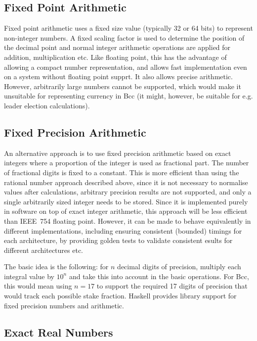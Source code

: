 \documentclass[11pt,a4paper,dvipsnames,twosided]{article}
\theoremstyle{definition}
\theoremstyle{definition}
\begin{document}
\subsection{Fixed Point Arithmetic}

Fixed point arithmetic uses a fixed size value (typically 32 or 64 bits) to
represent non-integer numbers.  A fixed scaling factor is used to determine the
position of the decimal point and normal integer arithmetic operations are
applied for addition, multiplication etc.  Like floating point, this has the
advantage of allowing a compact number representation, and allows fast implementation even on
a system without floating point supprt.  It also allows precise arithmetic.  However,
arbitrarily large numbers cannot be supported, which would make it unsuitable for
representing currency in Bcc (it might, however, be suitable for e.g. leader election calculations).


\subsection{Fixed Precision Arithmetic}
\label{sec:fixed-point-arithm}

An alternative approach is to use fixed precision arithmetic based on exact
integers where a proportion of the integer is used as fractional part.  The
number of fractional digits is fixed to a constant.  This is more efficient than
using the rational number approach described above, since it is not necessary to
normalise values after calculations, arbitrary precision results are not
supported, and only a single arbitrarily sized integer needs to be stored.
Since it is implemented purely in software on top of exact integer arithmetic,
this approach will be less efficient than IEEE~754 floating point.  However, it
can be made to behave equivalently in different implementations, including
ensuring consistent (bounded) timings for each architecture, by providing golden
tests to validate consistent esults for different architectures etc.

The basic idea is the following: for $n$ decimal digits of precision, multiply
each integral value by $10^{n}$ and take this into account in the basic
operations. For Bcc, this would mean using $n=17$ to support the required 17
digits of precision that would track each possible stake fraction.  Haskell
provides library support for fixed precision numbers and arithmetic.

\subsection{Exact Real Numbers}
\end{document}
